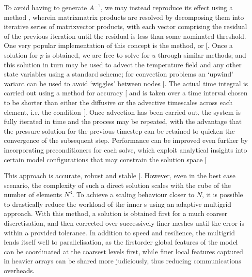 \documentclass[letterpaper,10pt,english]{jupyterBook}
\begin{document}
\sphinxAtStartPar
To avoid having to generate \(A^{-1}\), we may instead reproduce its effect using a  method , wherein matrix\sphinxhyphen{}matrix products are resolved by decomposing them into iterative series of matrix\sphinxhyphen{}vector products, with each vector comprising the residual of the previous iteration until the residual is less than some nominated threshold. One very popular implementation of this concept is the  method, or  {[}\sphinxcite{references:id62}{]}. Once a solution for \(p\) is obtained, we are free to solve for \(u\) through similar methods; and this solution in turn may be used to advect the temperature field and any other state variables using a standard  scheme; for convection problems an ‘upwind’ variant can be used to avoid ‘wiggles’ between nodes {[}\sphinxcite{references:id59}{]}. The actual time integral is carried out using a  method for accuracy {[}\sphinxcite{references:id60}{]} and is taken over a time interval chosen to be shorter than either the diffusive or the advective timescales across each element, i.e. the  condition {[}\sphinxcite{references:id63}{]}. Once advection has been carried out, the system is fully iterated in time and the process may be repeated, with the advantage that the pressure solution for the previous timestep can be retained to quicken the convergence of the subsequent step. Performance can be improved even further by incorporating preconditioners for each solve, which exploit  analytical insights into certain model configurations that may constrain the solution space {[}\sphinxcite{references:id72}{]}

\sphinxAtStartPar
This approach is accurate, robust and stable {[}\sphinxcite{references:id381}{]}. However, even in the best case scenario, the complexity of such a direct solution scales with the cube of the number of elements \(N^3\). To achieve a scaling behaviour closer to \(N\), it is possible to drastically reduce the workload of the inner s using an adaptive multi\sphinxhyphen{}grid approach. With this method, a solution is obtained first for a much coarser discretisation, and then corrected over successively finer meshes until the error is within a provided tolerance. In addition to speed and resilience, the multi\sphinxhyphen{}grid lends itself well to parallelisation, as the first\sphinxhyphen{}order global features of the model can be coordinated at the coarsest levels first, while finer local features captured in heavier arrays can be shared more judiciously, thus reducing communications overheads.
\end{document}
